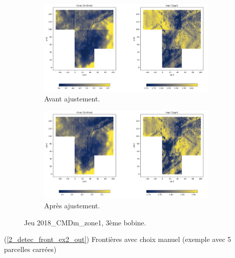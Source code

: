 \documentclass[12pt]{article}
\begin{document}
    \begin{figure}[ht!]
        \centering
        \begin{subfigure}[b]{\textwidth}
            \centering
            \includegraphics[width=0.95\textwidth]{Images/Frontiere_ex_3.png}
            \caption[]%
            {{ \small Avant ajustement.}}    
        \end{subfigure}
        \centering
        \begin{subfigure}[b]{\textwidth}  
            \centering 
            \includegraphics[width=0.95\textwidth]{Images/Frontiere_ex_3_aj.png}
            \caption[]%
            {{\small Après ajustement.}}    
        \end{subfigure}
        \caption{Jeu 2018\_CMDm\_zone1, 3ème bobine.}
    \end{figure}

\newpage
    \label{2_detec_front_ex2_in} (\ref{2_detec_front_ex2_out}) Frontières avec choix manuel (exemple avec 5 parcelles carrées)
\end{document}
